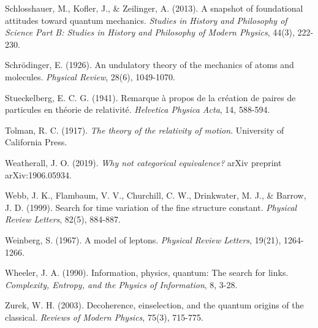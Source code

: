 \documentclass[a4paper,12pt]{article}
\begin{document}
\begin{thebibliography}{99}
		 Schlosshauer, M., Kofler, J., \& Zeilinger, A. (2013). A snapshot of foundational attitudes toward quantum mechanics. \textit{Studies in History and Philosophy of Science Part B: Studies in History and Philosophy of Modern Physics}, 44(3), 222-230.
		
		 Schrödinger, E. (1926). An undulatory theory of the mechanics of atoms and molecules. \textit{Physical Review}, 28(6), 1049-1070.
		
		 Stueckelberg, E. C. G. (1941). Remarque à propos de la création de paires de particules en théorie de relativité. \textit{Helvetica Physica Acta}, 14, 588-594.
		
		 Tolman, R. C. (1917). \textit{The theory of the relativity of motion}. University of California Press.
		
		 Weatherall, J. O. (2019). \textit{Why not categorical equivalence?} arXiv preprint arXiv:1906.05934.
		
		 Webb, J. K., Flambaum, V. V., Churchill, C. W., Drinkwater, M. J., \& Barrow, J. D. (1999). Search for time variation of the fine structure constant. \textit{Physical Review Letters}, 82(5), 884-887.
		
		 Weinberg, S. (1967). A model of leptons. \textit{Physical Review Letters}, 19(21), 1264-1266.
		
		 Wheeler, J. A. (1990). Information, physics, quantum: The search for links. \textit{Complexity, Entropy, and the Physics of Information}, 8, 3-28.
		
		 Zurek, W. H. (2003). Decoherence, einselection, and the quantum origins of the classical. \textit{Reviews of Modern Physics}, 75(3), 715-775.
	\end{thebibliography}
	
\end{document}
